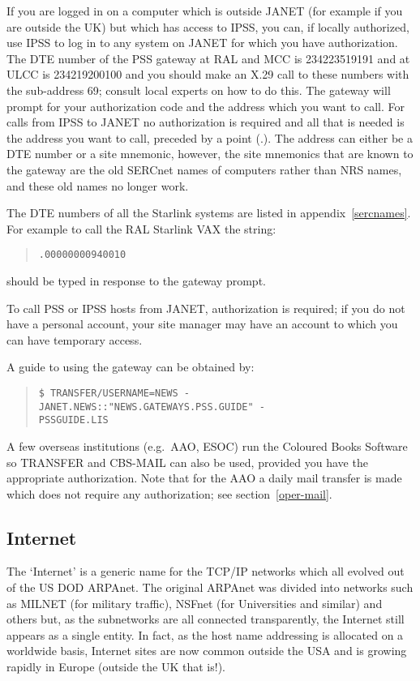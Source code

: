 If you are logged in on a computer which is outside JANET (for example if you
are outside the UK) but which has access to IPSS, you can, if locally
authorized, use IPSS to log in to any system on JANET for which you have
authorization.
The DTE number of the PSS gateway at RAL and MCC is 234223519191 and at ULCC is
234219200100 and you should make an X.29 call to these numbers with the
sub-address 69; consult local experts on how to do this.
The gateway will prompt for your authorization code and the address which you
want to call.
For calls from IPSS to JANET no authorization is required and all that is needed
is the address you want to call, preceded by a point (.).
The address can either be a DTE number or a site mnemonic, however, the site
mnemonics that are known to the gateway are the old SERCnet names of computers
rather than NRS names, and these old names no longer work.

The DTE numbers of all the Starlink systems are listed in
appendix~\ref{sercnames}.
For example to call the RAL Starlink VAX the string:
\begin{quote}
{\tt .00000000940010}
\end{quote}
should be typed in response to the gateway prompt.

To call PSS or IPSS hosts from JANET, authorization is required; if you do not
have a personal account, your site manager may have an account to which you can
have temporary access.

A guide to using the gateway can be obtained by:
\begin{quote}
{\tt \$ TRANSFER/USERNAME=NEWS -\\
\hspace*{30mm}JANET.NEWS::"NEWS.GATEWAYS.PSS.GUIDE" -\\
\hspace*{30mm}PSSGUIDE.LIS}
\end{quote}

A few overseas institutions (e.g.\ AAO, ESOC) run the Coloured Books Software so
TRANSFER and CBS-MAIL can also be used, provided you have the appropriate
authorization.
Note that for the AAO a daily mail transfer is made which does not require any
authorization; see section~\ref{oper-mail}.

\subsection{Internet}

The `Internet' is a generic name for the TCP/IP networks which all evolved out
of the US DOD ARPAnet. The original ARPAnet was divided  into networks such as
MILNET (for military traffic), NSFnet (for Universities and similar) and others
but, as the subnetworks are all connected transparently, the Internet still
appears as a single entity. In fact, as the host name addressing is  allocated
on a worldwide basis, Internet sites are now common outside the USA and is
growing rapidly in Europe (outside the UK that is!).


